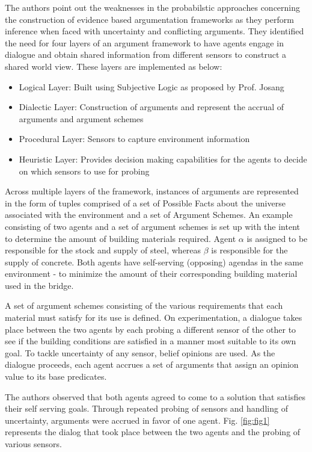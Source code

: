 \documentclass[sigconf]{acmart}
\begin{document}
The authors point out the weaknesses in the probabilstic approaches concerning the construction of evidence based argumentation frameworks as they perform 
inference when faced with uncertainty and conflicting arguments. They identified the need for four layers of an argument framework to have agents engage in dialogue 
and obtain shared information from different sensors to construct a shared world view. These layers are implemented as below:
\begin{itemize}
  \item Logical Layer: Built using Subjective Logic as proposed by Prof. Josang
  \item Dialectic Layer: Construction of arguments and represent the accrual of arguments and argument schemes
  \item Procedural Layer: Sensors to capture environment information
  \item Heuristic Layer: Provides decision making capabilities for the agents to decide on which sensors to use for probing
\end{itemize}

Across multiple layers of the framework, instances of arguments are represented in the form 
of tuples comprised of a set of Possible Facts about the universe associated with the environment and a set of Argument Schemes.
An example consisting of two agents and a set of argument schemes is set up with the intent to determine the amount of building materials required. Agent $\alpha$ is 
assigned to be responsible for the stock and supply of steel, whereas $\beta$ is responsible for the supply of concrete. Both agents have self-serving (opposing) 
agendas in the same environment - to minimize the amount of their corresponding building material used in the bridge.

A set of argument schemes consisting of the various requirements that each material must satisfy for its use is defined. On experimentation, a dialogue takes place 
between the two agents by each probing a different sensor of the other to see if the building conditions are satisfied in a manner most suitable to its 
own goal. To tackle uncertainty of any sensor, belief opinions are used. As the dialogue proceeds, each agent accrues a set of arguments that assign an opinion 
value to its base predicates.

The authors observed that both agents agreed to come to a solution that satisfies their self serving goals. Through repeated probing of sensors and 
handling of uncertainty, arguments were accrued in favor of one agent. Fig. \ref{fig:fig1} represents the dialog that took place between the two agents and the probing of various sensors.
\end{document}
